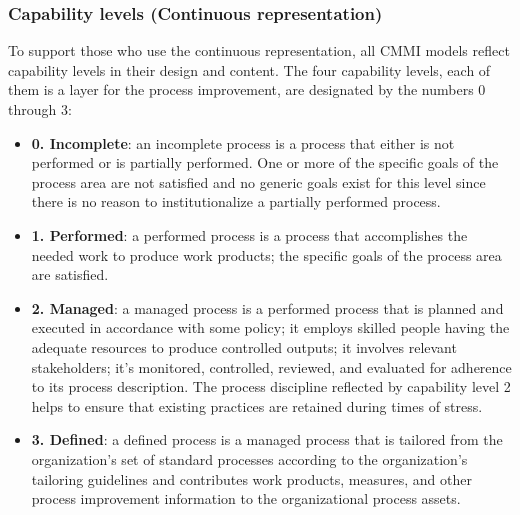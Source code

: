 \subsubsection{Capability levels (Continuous representation)}
To support those who use the continuous representation, all CMMI models reflect capability levels in their design and content.
The four capability levels, each of them is a layer for the process improvement, are designated by the numbers 0 through 3:
\begin{itemize}
      \item \textbf{0. Incomplete}: an incomplete process is a process that either is not performed or is partially performed. One or more of the specific goals of the process area are not satisfied and no generic goals exist for this level since there is no reason to institutionalize a partially performed process.
      \item \textbf{1. Performed}: a performed process is a process that accomplishes the needed work to produce work products; the specific goals of the process area are satisfied.
      \item \textbf{2. Managed}: a managed process is a performed process that is planned and executed in accordance with some policy; it employs skilled people having the adequate resources to produce controlled outputs; it involves relevant stakeholders; it's monitored, controlled, reviewed, and evaluated for adherence to its process description. The process discipline reflected by capability level 2 helps to ensure that existing practices are retained during times of stress.
      \item \textbf{3. Defined}: a defined process is a managed process that is tailored from the organization's set of standard processes according to the organization's tailoring guidelines and contributes work products, measures, and other process improvement information to the organizational process assets.
\end{itemize}

